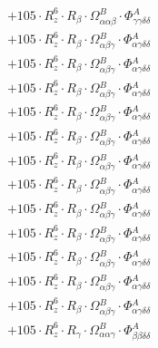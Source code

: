 \documentclass{article}
\begin{document}
\begin{subequations}
\begin{gather}
\begin{array}{c}
 \\[0.2em] 		 + 105 \cdot R_{z}^{6} \cdot R_{\beta{}} \cdot \Omega{}^{B}_{\alpha{}\alpha{}\beta{}} \cdot \Phi{}^{A}_{\gamma{}\gamma{}\delta{}\delta{}} 
 \\[0.2em] 		 + 105 \cdot R_{z}^{6} \cdot R_{\beta{}} \cdot \Omega{}^{B}_{\alpha{}\beta{}\gamma{}} \cdot \Phi{}^{A}_{\alpha{}\gamma{}\delta{}\delta{}} 
 \\[0.2em] 		 + 105 \cdot R_{z}^{6} \cdot R_{\beta{}} \cdot \Omega{}^{B}_{\alpha{}\beta{}\gamma{}} \cdot \Phi{}^{A}_{\alpha{}\gamma{}\delta{}\delta{}} 
 \\[0.2em] 		 + 105 \cdot R_{z}^{6} \cdot R_{\beta{}} \cdot \Omega{}^{B}_{\alpha{}\beta{}\gamma{}} \cdot \Phi{}^{A}_{\alpha{}\gamma{}\delta{}\delta{}} 
 \\[0.2em] 		 + 105 \cdot R_{z}^{6} \cdot R_{\beta{}} \cdot \Omega{}^{B}_{\alpha{}\beta{}\gamma{}} \cdot \Phi{}^{A}_{\alpha{}\gamma{}\delta{}\delta{}} 
 \\[0.2em] 		 + 105 \cdot R_{z}^{6} \cdot R_{\beta{}} \cdot \Omega{}^{B}_{\alpha{}\beta{}\gamma{}} \cdot \Phi{}^{A}_{\alpha{}\gamma{}\delta{}\delta{}} 
 \\[0.2em] 		 + 105 \cdot R_{z}^{6} \cdot R_{\beta{}} \cdot \Omega{}^{B}_{\alpha{}\beta{}\gamma{}} \cdot \Phi{}^{A}_{\alpha{}\gamma{}\delta{}\delta{}} 
 \\[0.2em] 		 + 105 \cdot R_{z}^{6} \cdot R_{\beta{}} \cdot \Omega{}^{B}_{\alpha{}\beta{}\gamma{}} \cdot \Phi{}^{A}_{\alpha{}\gamma{}\delta{}\delta{}} 
 \\[0.2em] 		 + 105 \cdot R_{z}^{6} \cdot R_{\beta{}} \cdot \Omega{}^{B}_{\alpha{}\beta{}\gamma{}} \cdot \Phi{}^{A}_{\alpha{}\gamma{}\delta{}\delta{}} 
 \\[0.2em] 		 + 105 \cdot R_{z}^{6} \cdot R_{\beta{}} \cdot \Omega{}^{B}_{\alpha{}\beta{}\gamma{}} \cdot \Phi{}^{A}_{\alpha{}\gamma{}\delta{}\delta{}} 
 \\[0.2em] 		 + 105 \cdot R_{z}^{6} \cdot R_{\beta{}} \cdot \Omega{}^{B}_{\alpha{}\beta{}\gamma{}} \cdot \Phi{}^{A}_{\alpha{}\gamma{}\delta{}\delta{}} 
 \\[0.2em] 		 + 105 \cdot R_{z}^{6} \cdot R_{\beta{}} \cdot \Omega{}^{B}_{\alpha{}\beta{}\gamma{}} \cdot \Phi{}^{A}_{\alpha{}\gamma{}\delta{}\delta{}} 
 \\[0.2em] 		 + 105 \cdot R_{z}^{6} \cdot R_{\beta{}} \cdot \Omega{}^{B}_{\alpha{}\beta{}\gamma{}} \cdot \Phi{}^{A}_{\alpha{}\gamma{}\delta{}\delta{}} 
 \\[0.2em] 		 + 105 \cdot R_{z}^{6} \cdot R_{\gamma{}} \cdot \Omega{}^{B}_{\alpha{}\alpha{}\gamma{}} \cdot \Phi{}^{A}_{\beta{}\beta{}\delta{}\delta{}} 

\end{array}
\end{gather}
\end{subequations}
\end{document}
